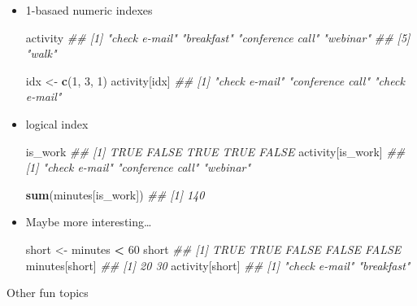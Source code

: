 \documentclass[]{book}
\newenvironment{Shaded}{\begin{snugshade}}{\end{snugshade}}
\newcommand{\CommentTok}[1]{\textcolor[rgb]{0.56,0.35,0.01}{\textit{#1}}}
\newcommand{\DecValTok}[1]{\textcolor[rgb]{0.00,0.00,0.81}{#1}}
\newcommand{\KeywordTok}[1]{\textcolor[rgb]{0.13,0.29,0.53}{\textbf{#1}}}
\newcommand{\NormalTok}[1]{#1}
\newcommand{\OperatorTok}[1]{\textcolor[rgb]{0.81,0.36,0.00}{\textbf{#1}}}
\newcommand{\StringTok}[1]{\textcolor[rgb]{0.31,0.60,0.02}{#1}}
\begin{document}
\begin{itemize}
\item
  1-basaed numeric indexes

\begin{Shaded}
\begin{Highlighting}[]
\NormalTok{activity}
\CommentTok{## [1] "check e-mail"    "breakfast"       "conference call" "webinar"        }
\CommentTok{## [5] "walk"}

\NormalTok{idx <-}\StringTok{ }\KeywordTok{c}\NormalTok{(}\DecValTok{1}\NormalTok{, }\DecValTok{3}\NormalTok{, }\DecValTok{1}\NormalTok{)}
\NormalTok{activity[idx]}
\CommentTok{## [1] "check e-mail"    "conference call" "check e-mail"}
\end{Highlighting}
\end{Shaded}
\item
  logical index

\begin{Shaded}
\begin{Highlighting}[]
\NormalTok{is_work}
\CommentTok{## [1]  TRUE FALSE  TRUE  TRUE FALSE}
\NormalTok{activity[is_work]}
\CommentTok{## [1] "check e-mail"    "conference call" "webinar"}

\KeywordTok{sum}\NormalTok{(minutes[is_work])}
\CommentTok{## [1] 140}
\end{Highlighting}
\end{Shaded}
\item
  Maybe more interesting\ldots{}

\begin{Shaded}
\begin{Highlighting}[]
\NormalTok{short <-}\StringTok{ }\NormalTok{minutes }\OperatorTok{<}\StringTok{ }\DecValTok{60}
\NormalTok{short}
\CommentTok{## [1]  TRUE  TRUE FALSE FALSE FALSE}
\NormalTok{minutes[short]}
\CommentTok{## [1] 20 30}
\NormalTok{activity[short]}
\CommentTok{## [1] "check e-mail" "breakfast"}
\end{Highlighting}
\end{Shaded}
\end{itemize}

Other fun topics
\end{document}
